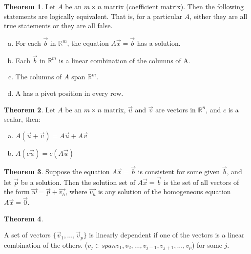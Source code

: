 \documentclass[a4paper,12pt]{article}
\theoremstyle{definition}
\newtheorem{theorem}{Theorem}
\theoremstyle{definition}
\newcommand{\finitevecs}[2]{#1_1,\ldots,#1_#2}
\newcommand{\finitevecsset}[2]{\{\finitevecs{#1}{#2}\}}
\begin{document}
	\begin{theorem}
		\label{thm:A-x-b-relation-thm}
		Let $A$ be an $m \times n$ matrix (coefficient matrix). Then the following statements are logically equivalent.
		That is, for a particular $A$, either they are all true statements or they are all false.
		\begin{enumerate}[a.]
			\item For each $\vec{b}$ in $\mathbb{R} ^ m$, the equation $A\vec{x} = \vec{b}$ has a solution.
			
			\item Each $\vec{b}$ in $\mathbb{R} ^ m$ is a linear combination of the columns of A.
			
			\item The columns of $A$ span $\mathbb{R} ^ m$.
			
			\item A has a pivot position in every row.
		\end{enumerate}
	\end{theorem}
	
	\begin{theorem}
		\label{thm:A-x-b-props}
		Let $A$ be an $m \times n$ matrix, $\vec{u}$ and $\vec{v}$ are vectors in $\mathbb{R}^n$, and $c$ is a scalar, then:
		
		\begin{enumerate}[a.]
			\item $A(\vec{u} + \vec{v}) = A\vec{u} + A\vec{v}$
			
			\item $A(c\vec{u}) = c(A\vec{u})$
		\end{enumerate}
	\end{theorem}
	
	\begin{theorem}
		\label{thm:non-homo-thm}
		Suppose the equation $A\vec{x} = \vec{b}$ is consistent for some given $\vec{b}$, and let $\vec{p}$ be a
		solution. Then the solution set of $A\vec{x} = \vec{b}$ is the set of all vectors of the form
		$\vec{w} = \vec{p} + \vec{v_h}$, where $\vec{v_h}$ is any solution of the homogeneous equation $A\vec{x} = \vec{0}$.
	\end{theorem}
	
	\begin{theorem}
		\label{thm:lin-dep-thm}
		
		A set of vectors $\finitevecsset{\vec{v}}{p}$ is linearly dependent if one of the vectors is a linear combination of the others. ($v_j \in span{v_1, v_2,\ldots,v_{j-1}, v_{j+1},\ldots,v_p}$) for some $j$.
	\end{theorem}
	
\end{document}
